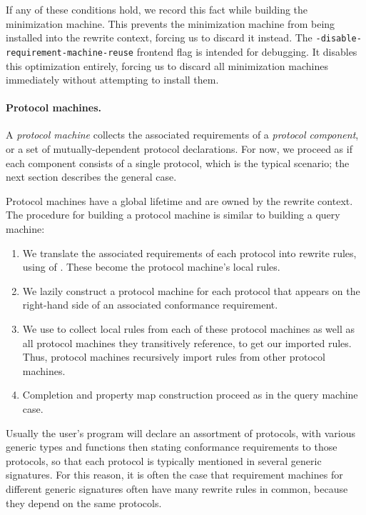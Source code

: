 \documentclass[../generics]{subfiles}
\begin{document}
If any of these conditions hold, we record this fact while building the minimization machine. This prevents the minimization machine from being installed into the rewrite context, forcing us to discard it instead. The \texttt{-disable-requirement-machine-reuse} frontend flag is intended for debugging. It disables this optimization entirely, forcing us to discard all minimization machines immediately without attempting to install them.

\paragraph{Protocol machines.}
A \emph{protocol machine} collects the associated requirements of a \emph{protocol component}, or a set of mutually-dependent protocol declarations. For now, we proceed as if each component consists of a single protocol, which is the typical scenario; the next section describes the general case.

Protocol machines have a global lifetime and are owned by the rewrite context. The procedure for building a protocol machine is similar to building a query machine:
\begin{enumerate}
\item We translate the associated requirements of each protocol into rewrite rules, using  of . These become the protocol machine's local rules.
\item We lazily construct a protocol machine for each protocol that appears on the right-hand side of an associated conformance requirement.
\item We use  to collect local rules from each of these protocol machines as well as all protocol machines they transitively reference, to get our imported rules. Thus, protocol machines recursively import rules from other protocol machines.
\item Completion and property map construction proceed as in the query machine case.
\end{enumerate}

Usually the user's program will declare an assortment of protocols, with various generic types and functions then stating conformance requirements to those protocols, so that each protocol is typically mentioned in several generic signatures. For this reason, it is often the case that requirement machines for different generic signatures often have many rewrite rules in common, because they depend on the same protocols.
\end{document}
